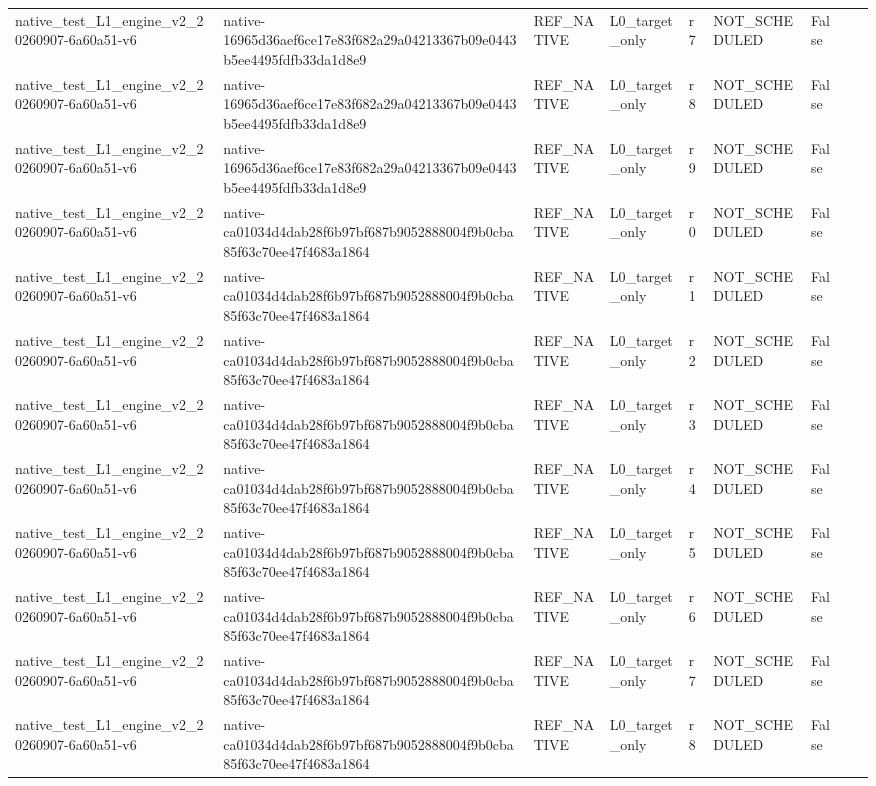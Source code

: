 \begin{tabular}{lllllllll}
native\_test\_L1\_engine\_v2\_20260907-6a60a51-v6 & native-16965d36aef6ce17e83f682a29a04213367b09e0443b5ee4495fdfb33da1d8e9 & REF\_NATIVE & L0\_target\_only & r7 & NOT\_SCHEDULED & False &  &  \\
native\_test\_L1\_engine\_v2\_20260907-6a60a51-v6 & native-16965d36aef6ce17e83f682a29a04213367b09e0443b5ee4495fdfb33da1d8e9 & REF\_NATIVE & L0\_target\_only & r8 & NOT\_SCHEDULED & False &  &  \\
native\_test\_L1\_engine\_v2\_20260907-6a60a51-v6 & native-16965d36aef6ce17e83f682a29a04213367b09e0443b5ee4495fdfb33da1d8e9 & REF\_NATIVE & L0\_target\_only & r9 & NOT\_SCHEDULED & False &  &  \\
native\_test\_L1\_engine\_v2\_20260907-6a60a51-v6 & native-ca01034d4dab28f6b97bf687b9052888004f9b0cba85f63c70ee47f4683a1864 & REF\_NATIVE & L0\_target\_only & r0 & NOT\_SCHEDULED & False &  &  \\
native\_test\_L1\_engine\_v2\_20260907-6a60a51-v6 & native-ca01034d4dab28f6b97bf687b9052888004f9b0cba85f63c70ee47f4683a1864 & REF\_NATIVE & L0\_target\_only & r1 & NOT\_SCHEDULED & False &  &  \\
native\_test\_L1\_engine\_v2\_20260907-6a60a51-v6 & native-ca01034d4dab28f6b97bf687b9052888004f9b0cba85f63c70ee47f4683a1864 & REF\_NATIVE & L0\_target\_only & r2 & NOT\_SCHEDULED & False &  &  \\
native\_test\_L1\_engine\_v2\_20260907-6a60a51-v6 & native-ca01034d4dab28f6b97bf687b9052888004f9b0cba85f63c70ee47f4683a1864 & REF\_NATIVE & L0\_target\_only & r3 & NOT\_SCHEDULED & False &  &  \\
native\_test\_L1\_engine\_v2\_20260907-6a60a51-v6 & native-ca01034d4dab28f6b97bf687b9052888004f9b0cba85f63c70ee47f4683a1864 & REF\_NATIVE & L0\_target\_only & r4 & NOT\_SCHEDULED & False &  &  \\
native\_test\_L1\_engine\_v2\_20260907-6a60a51-v6 & native-ca01034d4dab28f6b97bf687b9052888004f9b0cba85f63c70ee47f4683a1864 & REF\_NATIVE & L0\_target\_only & r5 & NOT\_SCHEDULED & False &  &  \\
native\_test\_L1\_engine\_v2\_20260907-6a60a51-v6 & native-ca01034d4dab28f6b97bf687b9052888004f9b0cba85f63c70ee47f4683a1864 & REF\_NATIVE & L0\_target\_only & r6 & NOT\_SCHEDULED & False &  &  \\
native\_test\_L1\_engine\_v2\_20260907-6a60a51-v6 & native-ca01034d4dab28f6b97bf687b9052888004f9b0cba85f63c70ee47f4683a1864 & REF\_NATIVE & L0\_target\_only & r7 & NOT\_SCHEDULED & False &  &  \\
native\_test\_L1\_engine\_v2\_20260907-6a60a51-v6 & native-ca01034d4dab28f6b97bf687b9052888004f9b0cba85f63c70ee47f4683a1864 & REF\_NATIVE & L0\_target\_only & r8 & NOT\_SCHEDULED & False &  &  \\

\end{tabular}
